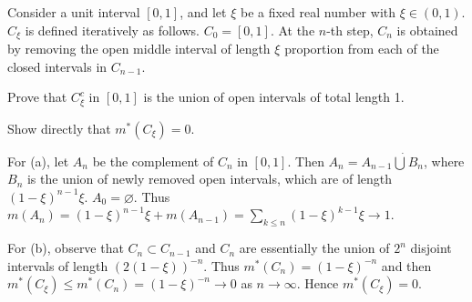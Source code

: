 \begin{exercise}
    Consider a unit interval $[0,1]$, and let $\xi$ be a fixed 
    real number with $\xi\in(0,1)$. $C_\xi$ is defined
    iteratively as follows. $C_0 = [0,1]$. At the $n$-th step,
    $C_n$ is obtained by removing the open middle interval of
    length $\xi$ proportion from each of the closed intervals 
    in $C_{n-1}$. 
    \begin{thmenum}
        \item Prove that $C_\xi^c$ in $[0,1]$ is the union of 
        open intervals of total length 1.
        \item Show directly that $m^*(C_\xi) = 0$. 
    \end{thmenum}
\end{exercise}
\begin{pf}
    For (a), let $A_n$ be the complement of $C_n$ in $[0,1]$. 
    Then $A_n = A_{n-1}\dot{\bigcup} B_n$, where $B_n$ is the
    union of newly removed open intervals, which are of length
    $(1-\xi)^{n-1}\xi$. $A_0 = \varnothing$. Thus $m(A_n) = 
    (1-\xi)^{n-1}\xi + m(A_{n-1}) = \sum_{k\leq n}(1-\xi)^{k-1}\xi 
    \to 1$. 

    For (b), observe that $C_n\subset C_{n-1}$ and $C_n$ are 
    essentially the union of $2^n$ disjoint intervals of length 
    $(2(1-\xi))^{-n}$. Thus $m^*(C_n) = (1-\xi)^{-n}$ and then
    $m^*(C_\xi)\leq m^*(C_n) = (1-\xi)^{-n} \to 0$ as 
    $n\to\infty$. Hence $m^*(C_\xi) = 0$.
\end{pf}

